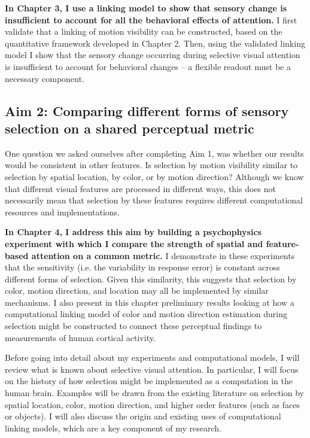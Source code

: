 \textbf{In Chapter 3, I use a linking model to show that sensory change is insufficient to account for all the behavioral effects of attention.} I first validate that a linking of motion visibility can be constructed, based on the quantitative framework developed in Chapter 2. Then, using the validated linking model I show that the sensory change occurring during selective visual attention is insufficient to account for behavioral changes -- a flexible readout must be a necessary component.

\subsection{Aim 2: Comparing different forms of sensory selection on a shared perceptual metric}

One question we asked ourselves after completing Aim 1, was whether our results would be consistent in other features. Is selection by motion visibility similar to selection by spatial location, by color, or by motion direction? Although we know that different visual features are processed in different ways, this does not necessarily mean that selection by these features requires different computational resources and implementations.

\textbf{In Chapter 4, I address this aim by building a psychophysics experiment with which I compare the strength of spatial and feature-based attention on a common metric.} I demonstrate in these experiments that the sensitivity (i.e. the variability in response error) is constant across different forms of selection. Given this similarity, this suggests that selection by color, motion direction, and location may all be implemented by similar mechanisms. I also present in this chapter preliminary results looking at how a computational linking model of color and motion direction estimation during selection might be constructed to connect these perceptual findings to measurements of human cortical activity. 

\break

Before going into detail about my experiments and computational models, I will review what is known about selective visual attention. In particular, I will focus on the history of how selection might be implemented as a computation in the human brain. Examples will be drawn from the existing literature on selection by spatial location, color, motion direction, and higher order features (such as faces or objects). I will also discuss the origin and existing uses of computational linking models, which are a key component of my research.

